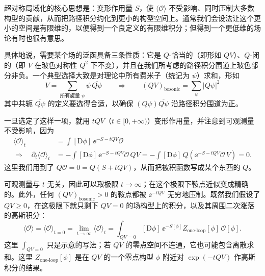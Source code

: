 超对称局域化的核心思想是：变形作用量 $S$，使 $\langle\mathcal{O}\rangle$ 不受影响、同时压制大多数构型的贡献，从而把路径积分约化到更小的构型空间上。通常我们会设法让这个更小的空间是有限维的，以便得到一个良定义的有限维积分；但得到一个更低维的场论有时也很有意思。

具体地说，需要某个场的泛函具备三条性质：它是 $Q$-恰当的（即形如 $QV$）、$Q$-闭的（即 $V$ 在玻色对称性 $Q^2$ 下不变），并且在我们所考虑的路径积分围道上玻色部分非负。一个典型选择大致是对理论中所有费米子（统记为 $\psi$）求和，形如
\begin{equation}
  V=\sum_{\text{所有旋量 }\psi}\psi\,\overline{Q\psi}
  \qquad\Longrightarrow\qquad
  (QV)_{\text{bosonic}}=\sum_{\psi}|Q\psi|^2
  \tag{5.11}
\end{equation}
其中共轭 $\overline{Q\psi}$ 的定义要选得合适，以确保 $(Q\psi)\overline{Q\psi}$ 沿路径积分围道为正。



 一旦选定了这样一项，就用 $tQV$（$t\in[0,+\infty)$）变形作用量，并注意到可观测量不受影响，因为
\begin{equation}
\begin{aligned}
  \langle\mathcal{O}\rangle_t&=\int[\mathrm{D}\phi]\,\ee^{-S-tQV}\mathcal{O}\\
  \Longrightarrow\quad
  \partial_t\langle\mathcal{O}\rangle_t
  &=-\int[\mathrm{D}\phi]\,\ee^{-S-tQV}\mathcal{O}\,QV
   =-\int[\mathrm{D}\phi]\,Q\!\left(\ee^{-S-tQV}\mathcal{O}\,V\right)=0.
\end{aligned}
  \tag{5.12}
\end{equation}
这里我们用到了 $Q\mathcal{O}=0=Q(S+tQV)$，从而把被积函数写成某个东西的 $Q$。

可观测量与 $t$ 无关，因此可以取极限 $t\to\infty$；在这个极限下鞍点近似变成精确的。此外，任何 $(QV)_{\text{bosonic}}>0$ 的鞍点都被 $\ee^{-tQV}$ 无穷地压制。既然我们假设了 $QV\ge0$，在这极限下就只剩下 $QV=0$ 的场构型上的积分，以及其周围二次涨落的高斯积分：
\begin{equation}
  \langle\mathcal{O}\rangle=\langle\mathcal{O}\rangle_{t=0}
  =\lim_{t\to\infty}\langle\mathcal{O}\rangle_t
  =\int_{QV=0}[\mathrm{D}\phi]\,\ee^{-S[\phi]}Z_{\text{one-loop}}[\phi]\,\mathcal{O}[\phi].
  \tag{5.13}
\end{equation}
这里 $\int_{QV=0}$ 只是示意的写法；若 $QV$ 的零点空间不连通，它也可能包含离散求和。这里 $Z_{\text{one-loop}}[\phi]$ 是在 $QV$ 的一个零点构型 $\phi$ 附近对 $\exp(-tQV)$ 作高斯积分的结果。

